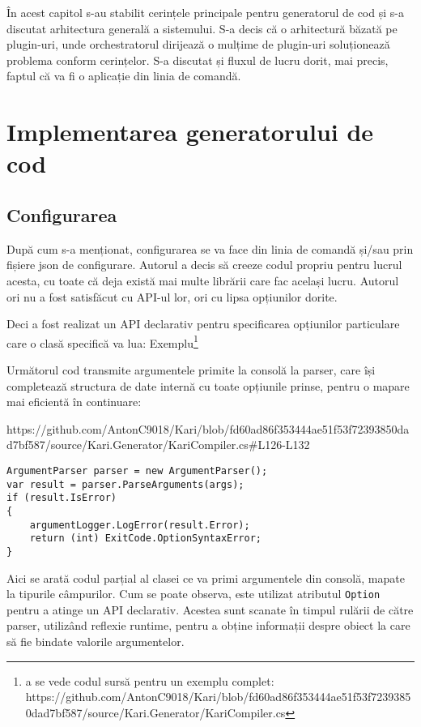 \documentclass[a4paper,12pt]{report}
\begin{document}
În acest capitol s-au stabilit cerințele principale pentru generatorul de cod și s-a discutat arhitectura generală a sistemului.
S-a decis că o arhitectură băzată pe plugin-uri, unde orchestratorul dirijează o mulțime de plugin-uri soluționează problema conform cerințelor.
S-a discutat și fluxul de lucru dorit, mai precis, faptul că va fi o aplicație din linia de comandă.


\chapter{Implementarea generatorului de cod}

\section{Configurarea}

După cum s-a menționat, configurarea se va face din linia de comandă și/sau prin fișiere json de configurare.
Autorul a decis să creeze codul propriu pentru lucrul acesta, cu toate că deja există mai multe librării care fac același lucru.
Autorul ori nu a fost satisfăcut cu API-ul lor, ori cu lipsa opțiunilor dorite.

Deci a fost realizat un API declarativ pentru specificarea opțiunilor particulare care o clasă specifică va lua:
Exemplu\footnote{a se vede codul sursă pentru un exemplu complet:
https://github.com/AntonC9018/Kari/blob/fd60ad86f353444ae51f53f72393850dad7bf587/source/Kari.Generator/KariCompiler.cs
}

Următorul cod transmite argumentele primite la consolă la parser, care își completează structura de date internă cu toate opțiunile prinse, pentru o mapare mai eficientă în continuare:


https://github.com/AntonC9018/Kari/blob/fd60ad86f353444ae51f53f72393850dad7bf587/source/Kari.Generator/KariCompiler.cs#L126-L132

\begin{verbatim}
ArgumentParser parser = new ArgumentParser();
var result = parser.ParseArguments(args);
if (result.IsError)
{
    argumentLogger.LogError(result.Error);
    return (int) ExitCode.OptionSyntaxError;
}
\end{verbatim}

Aici se arată codul parțial al clasei ce va primi argumentele din consolă, mapate la tipurile câmpurilor.
Cum se poate observa, este utilizat atributul \texttt{Option} pentru a atinge un API declarativ.
Acestea sunt scanate în timpul rulării de către parser, utilizând reflexie runtime, pentru a obține informații despre obiect la care să fie bindate valorile argumentelor. 
\end{document}

